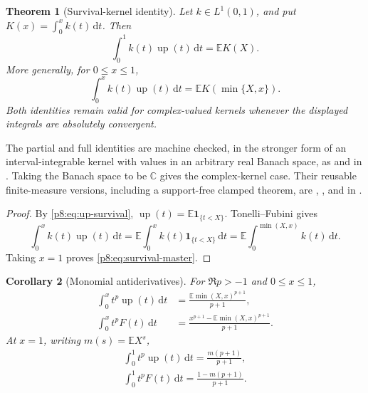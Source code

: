 \documentclass[11pt,oneside]{article}
\newtheorem{theorem}{Theorem}[section]
\newtheorem{corollary}[theorem]{Corollary}
\theoremstyle{definition}
\theoremstyle{remark}
\newcommand{\Up}{\operatorname{up}}
\newcommand{\E}{\mathbb E}
\newcommand{\C}{\mathbb C}
\newcommand{\dd}{\,\mathrm d}
\newcommand{\1}{\mathbf 1}
\begin{document}
\begin{theorem}[Survival-kernel identity]
\label{p8:thm:survival-kernel}
Let \(k\in L^1(0,1)\), and put \(K(x)=\int_0^x k(t)\dd t\).  Then
\begin{equation}
 \boxed{\int_0^1 k(t)\Up(t)\dd t=\E K(X).}
 \label{p8:eq:survival-master}
\end{equation}
More generally, for \(0\le x\le1\),
\begin{equation}
 \boxed{\int_0^x k(t)\Up(t)\dd t
 =\E K(\min\{X,x\}).}
 \label{p8:eq:survival-partial}
\end{equation}
Both identities remain valid for complex-valued kernels whenever the displayed
integrals are absolutely convergent.  \statusprovedPartll
\end{theorem}

\begin{statusbox}
The partial and full identities are machine checked, in the stronger form of an
interval-integrable kernel with values in an arbitrary real Banach space, as
and
in .  Taking the Banach space to be \(\C\)
gives the complex-kernel case.  Their reusable finite-measure versions, including a
support-free clamped theorem, are
,
, and
 in
.
\end{statusbox}

\begin{proof}
By \eqref{p8:eq:up-survival},
\(\Up(t)=\E\mathbf1_{\{t<X\}}\).  Tonelli--Fubini gives
\[
 \int_0^x k(t)\Up(t)\dd t
 =\E\int_0^x k(t)\mathbf1_{\{t<X\}}\dd t
 =\E\int_0^{\min(X,x)}k(t)\dd t.
\]
Taking \(x=1\) proves \eqref{p8:eq:survival-master}.
\end{proof}

\begin{corollary}[Monomial antiderivatives]
\label{p8:cor:monomial-partial}
For \(\Re p>-1\) and \(0\le x\le1\),
\begin{align}
 \int_0^x t^p\Up(t)\dd t
 &=\frac{\E\min(X,x)^{p+1}}{p+1},
 \label{p8:eq:up-monomial-partial}\\
 \int_0^x t^pF(t)\dd t
 &=\frac{x^{p+1}-\E\min(X,x)^{p+1}}{p+1}.
 \label{p8:eq:F-monomial-partial}
\end{align}
At \(x=1\), writing \(m(s)=\E X^s\),
\begin{align}
 \boxed{\int_0^1t^p\Up(t)\dd t=\frac{m(p+1)}{p+1},}
 \label{p8:eq:up-monomial-full}\\
 \boxed{\int_0^1t^pF(t)\dd t=\frac{1-m(p+1)}{p+1}.}
 \label{p8:eq:F-monomial-full}
\end{align}
\statusprovedPartll
\end{corollary}
\end{document}
